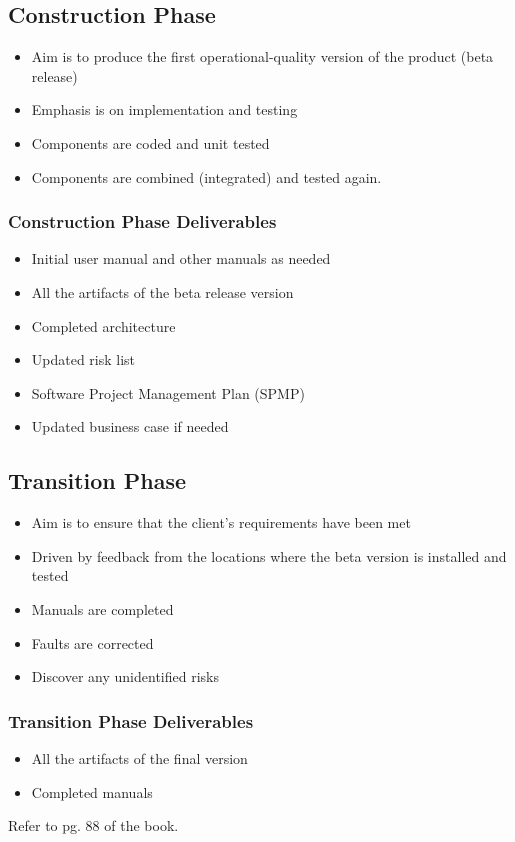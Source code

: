 \documentclass{report}
\begin{document}
			\subsection{Construction Phase} 
				\begin{itemize}
					\item Aim is to produce the first operational-quality version of the product (beta release)
					\item Emphasis is on implementation and testing
					\item Components are coded and unit tested
					\item Components are combined (integrated) and tested again.
				\end{itemize}
				\subsubsection{Construction Phase Deliverables}
					\begin{itemize}
						\item Initial user manual and other manuals as needed
						\item All the artifacts of the beta release version
						\item Completed architecture
						\item Updated risk list
						\item Software Project Management Plan (SPMP)
						\item Updated business case if needed
					\end{itemize}
			\subsection{Transition Phase}
				\begin{itemize}
					\item Aim is to ensure that the client's requirements have been met
					\item Driven by feedback from the locations where the beta version is installed and tested
					\item Manuals are completed
					\item Faults are corrected
					\item Discover any unidentified risks
				\end{itemize}
				\subsubsection{Transition Phase Deliverables}
					\begin{itemize}
						\item All the artifacts of the final version
						\item Completed manuals
					\end{itemize}
					Refer to pg. 88 of the book.
\end{document}
